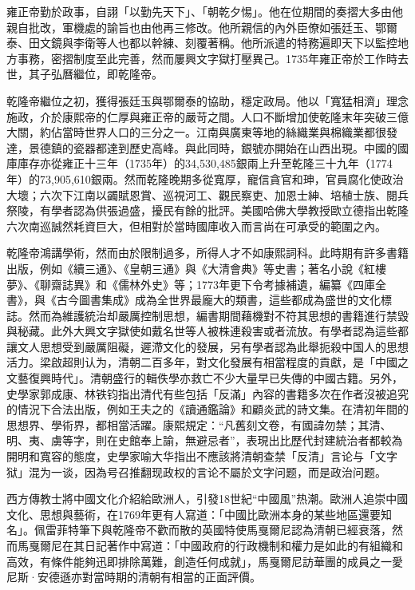 雍正帝勤於政事，自詡「以勤先天下」、「朝乾夕惕」。他在位期間的奏摺大多由他親自批改，軍機處的諭旨也由他再三修改。他所親信的內外臣僚如張廷玉、鄂爾泰、田文鏡與李衛等人也都以幹練、刻覆著稱。他所派遣的特務遍即天下以監控地方事務，密摺制度至此完善，然而屢興文字獄打壓異己。1735年雍正帝於工作時去世，其子弘曆繼位，即乾隆帝。

乾隆帝繼位之初，獲得張廷玉與鄂爾泰的協助，穩定政局。他以「寬猛相濟」理念施政，介於康熙帝的仁厚與雍正帝的嚴苛之間。人口不斷增加使乾隆末年突破三億大關，約佔當時世界人口的三分之一。江南與廣東等地的絲織業與棉織業都很發達，景德鎮的瓷器都達到歷史高峰。與此同時，銀號亦開始在山西出現。中國的國庫庫存亦從雍正十三年（1735年）的34,530,485銀兩上升至乾隆三十九年（1774年）的73,905,610銀兩。然而乾隆晚期多從寬厚，寵信貪官和珅，官員腐化使政治大壞；六次下江南以蠲賦恩賞、巡視河工、觀民察吏、加恩士紳、培植士族、閱兵祭陵，有學者認為供張過盛，擾民有餘的批評。美國哈佛大學教授歐立德指出乾隆六次南巡誠然耗資巨大，但相對於當時國庫收入而言尚在可承受的範圍之內。

乾隆帝鴻講學術，然而由於限制過多，所得人才不如康熙詞科。此時期有許多書籍出版，例如《續三通》、《皇朝三通》與《大清會典》等史書；著名小說《紅樓夢》、《聊齋誌異》和《儒林外史》等；1773年更下令考據補遺，編纂《四庫全書》，與《古今圖書集成》成為全世界最龐大的類書，這些都成為盛世的文化標誌。然而為維護統治却嚴厲控制思想，編書期間藉機對不符其思想的書籍進行禁毀與秘藏。此外大興文字獄使如戴名世等人被株連殺害或者流放。有學者認為這些都讓文人思想受到嚴厲阻礙，遲滯文化的發展，另有學者認為此舉扼殺中国人的思想活力。梁啟超則认为，清朝二百多年，對文化發展有相當程度的貢獻，是「中國之文藝復興時代」。清朝盛行的輯佚學亦救亡不少大量早已失傳的中國古籍。另外，史學家郭成康、林铁钧指出清代有些包括「反滿」內容的書籍多次在作者沒被追究的情況下合法出版，例如王夫之的《讀通鑑論》和顧炎武的詩文集。在清初年間的思想界、學術界，都相當活躍。康熙規定：“凡舊刻文卷，有國諱勿禁；其清、明、夷、虜等字，則在史館奉上諭，無避忌者”，表現出比歷代封建統治者都較為開明和寬容的態度，史學家喻大华指出不應該將清朝查禁「反清」言论与「文字狱」混为一谈，因為号召推翻现政权的言论不屬於文字问题，而是政治问题。

西方傳教士將中國文化介紹給歐洲人，引發18世紀“中國風”热潮。歐洲人追崇中國文化、思想與藝術，在1769年更有人寫道：「中國比歐洲本身的某些地區還要知名」。佩雷菲特筆下與乾隆帝不歡而散的英國特使馬戛爾尼認為清朝已經衰落，然而馬戛爾尼在其日記著作中寫道：「中國政府的行政機制和權力是如此的有組織和高效，有條件能夠迅即排除萬難，創造任何成就」，馬戛爾尼訪華團的成員之一愛尼斯·安德遜亦對當時期的清朝有相當的正面評價。

